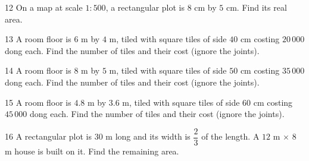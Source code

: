 \gap
\begin{probbox}{12}{\relax}
On a map at scale $1:500$, a rectangular plot is $8$ cm by $5$ cm. Find its real area.
\end{probbox}
\gap
\begin{probbox}{13}{\relax}
A room floor is $6$ m by $4$ m, tiled with square tiles of side $40$ cm costing $20\,000$ dong each. Find the number of tiles and their cost (ignore the joints).
\end{probbox}
\gap
\begin{probbox}{14}{\relax}
A room floor is $8$ m by $5$ m, tiled with square tiles of side $50$ cm costing $35\,000$ dong each. Find the number of tiles and their cost (ignore the joints).
\end{probbox}
\gap
\begin{probbox}{15}{\relax}
A room floor is $4.8$ m by $3.6$ m, tiled with square tiles of side $60$ cm costing $45\,000$ dong each. Find the number of tiles and their cost (ignore the joints).
\end{probbox}
\gap
\begin{probbox}{16}{\relax}
A rectangular plot is $30$ m long and its width is $\dfrac{2}{3}$ of the length. A $12$ m $\times$ $8$ m house is built on it. Find the remaining area.
\end{probbox}
